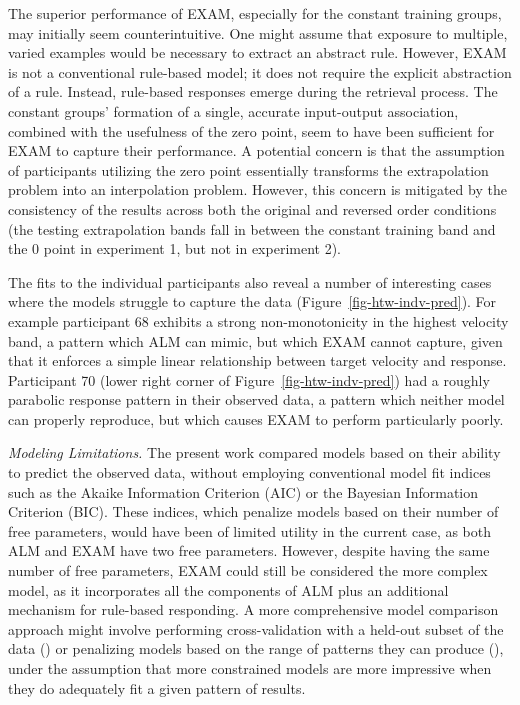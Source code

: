 \documentclass[
  11pt,
  letterpaper,
]{article}
\begin{document}
The superior performance of EXAM, especially for the constant training
groups, may initially seem counterintuitive. One might assume that
exposure to multiple, varied examples would be necessary to extract an
abstract rule. However, EXAM is not a conventional rule-based model; it
does not require the explicit abstraction of a rule. Instead, rule-based
responses emerge during the retrieval process. The constant groups'
formation of a single, accurate input-output association, combined with
the usefulness of the zero point, seem to have been sufficient for EXAM
to capture their performance. A potential concern is that the assumption
of participants utilizing the zero point essentially transforms the
extrapolation problem into an interpolation problem. However, this
concern is mitigated by the consistency of the results across both the
original and reversed order conditions (the testing extrapolation bands
fall in between the constant training band and the 0 point in experiment
1, but not in experiment 2).

The fits to the individual participants also reveal a number of
interesting cases where the models struggle to capture the data
(Figure~\ref{fig-htw-indv-pred}). For example participant 68 exhibits a
strong non-monotonicity in the highest velocity band, a pattern which
ALM can mimic, but which EXAM cannot capture, given that it enforces a
simple linear relationship between target velocity and response.
Participant 70 (lower right corner of Figure~\ref{fig-htw-indv-pred})
had a roughly parabolic response pattern in their observed data, a
pattern which neither model can properly reproduce, but which causes
EXAM to perform particularly poorly.

\emph{Modeling Limitations.} The present work compared models based on
their ability to predict the observed data, without employing
conventional model fit indices such as the Akaike Information Criterion
(AIC) or the Bayesian Information Criterion (BIC). These indices, which
penalize models based on their number of free parameters, would have
been of limited utility in the current case, as both ALM and EXAM have
two free parameters. However, despite having the same number of free
parameters, EXAM could still be considered the more complex model, as it
incorporates all the components of ALM plus an additional mechanism for
rule-based responding. A more comprehensive model comparison approach
might involve performing cross-validation with a held-out subset of the
data () or penalizing models based on the range of patterns they can
produce (), under the assumption that more constrained models are more
impressive when they do adequately fit a given pattern of results.
\end{document}
